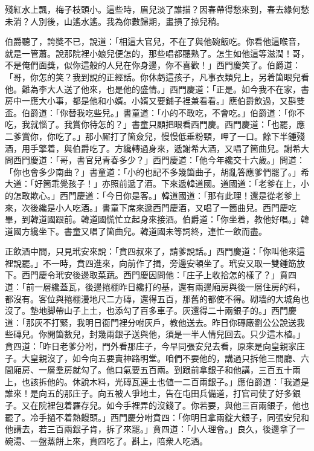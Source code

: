 \begin{myquote} 
殘紅水上飄，梅子枝頭小。這些時，眉兒淡了誰描？因春帶得愁來到，春去緣何愁未消？人別後，山遙水遙。我為你數歸期，畫損了掠兒稍。
\end{myquote} 

伯爵聽了，誇獎不已，說道：「相這大官兒，不在了與他碗飯吃。你看他這喉音，就是一管蕭。說那院裡小娘兒便怎的，那些唱都聽熟了。怎生如他這等滋潤！哥，不是俺們面獎，似你這般的人兒在你身邊，你不喜歡！」西門慶笑了。伯爵道：「哥，你怎的笑？我到說的正經話。{}你休虧這孩子，凡事衣類兒上，另着箇眼兒看他。難為李大人送了他來，也是他的盛情。」西門慶道：「正是。如今我不在家，書房中一應大小事，都是他和小婿。小婿又要鋪子裡兼看看。」應伯爵飲過，又斟雙盃。伯爵道：「你替我吃些兒。」書童道：「小的不敢吃，不會吃。」伯爵道：「你不吃，我就惱了。我賞你待怎的？」書童只顧把眼看西門慶。西門慶道：「也罷，應二爹賞你，你吃了。」那小厮打了箇僉兒，慢慢低垂粉頸，呷了一口。餘下半鍾殘酒，用手擎着，與伯爵吃了。方纔轉過身來，遞謝希大酒，又唱了箇曲兒。謝希大問西門慶道：「哥，書官兒青春多少？」西門慶道：「他今年纔交十六歲。」問道：「你也會多少南曲？」書童道：「小的也記不多幾箇曲子，胡亂答應爹們罷了。」希大道：「好箇乖覺孩子！」亦照前遞了酒。下來遞韓道國。道國道：「老爹在上，小的怎敢欺心。」西門慶道：「今日你是客。」韓道國道：「那有此理！還是從老爹上來，次後纔是小人吃酒。」書童下席來遞西門慶酒，又唱了一箇曲兒。西門慶吃畢，到韓道國跟前。韓道國慌忙立起身來接酒。伯爵道：「你坐着，教他好唱。」韓道國方纔坐下。書童又唱了箇曲兒。韓道國未等詞終，連忙一飲而盡。

正飲酒中間，只見玳安來說：「賁四叔來了，請爹說話。」西門慶道：「你叫他來這裡說罷。」不一時，賁四進來，向前作了揖，旁邊安頓坐了。玳安又取一雙鍾筯放下。西門慶令玳安後邊取菜蔬。西門慶因問他：「庄子上收拾怎的樣了？」賁四道：「前一層纔蓋瓦，後邊捲棚昨日纔打的基，還有兩邊廂房與後一層住房的料，都沒有。客位與捲棚漫地尺二方磚，還得五百，那舊的都使不得。砌墻的大城角也沒了。墊地脚帶山子上土，也添勾了百多車子。灰還得二十兩銀子的。」西門慶道：「那灰不打緊，我明日衙門裡分咐灰戶，教他送去。昨日你磚廠劉公公說送我些磚兒。你開箇數兒，封幾兩銀子送與他，須是一半人情兒回去。只少這木植。」賁四道：「昨日老爹分咐，門外看那庄子，今早同張安兒去看，原來是向皇親家庄子。大皇親沒了，如今向五要賣神路明堂。咱們不要他的，講過只拆他三間廳、六間廂房、一層羣房就勾了。他口氣要五百兩。到跟前拿銀子和他講，三百五十兩上，也該拆他的。休說木料，光磚瓦連土也値一二百兩銀子。」應伯爵道：「我道是誰來！是向五的那庄子。向五被人爭地土，告在屯田兵備道，打官司使了好多銀子。又在院裡包着羅存兒。如今手裡弄的沒錢了。你若要，與他三百兩銀子，他也罷了。冷手撾不着熱饅頭。」西門慶分咐賁四：「你明日拿兩錠大銀子，同張安兒和他講去，若三百兩銀子肯，拆了來罷。」賁四道：「小人理會。」良久，後邊拿了一碗湯、一盤蒸餅上來，賁四吃了。斟上，陪衆人吃酒。

